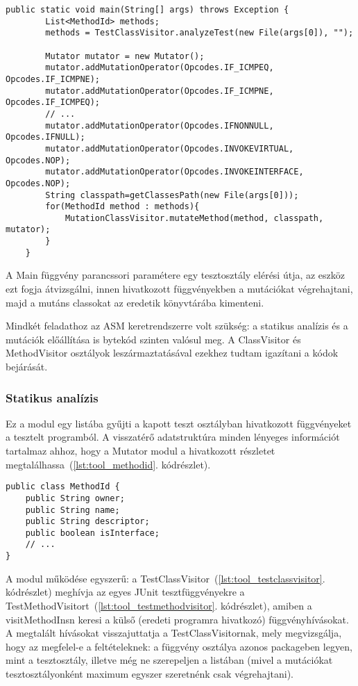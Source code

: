 \begin{lstlisting}[frame=single,float=!ht,caption={Main függvény},captionpos=b,label={lst:tool_main}]
    public static void main(String[] args) throws Exception {
        List<MethodId> methods;
        methods = TestClassVisitor.analyzeTest(new File(args[0]), "");

        Mutator mutator = new Mutator();
        mutator.addMutationOperator(Opcodes.IF_ICMPEQ, Opcodes.IF_ICMPNE);
        mutator.addMutationOperator(Opcodes.IF_ICMPNE, Opcodes.IF_ICMPEQ);
        // ...
        mutator.addMutationOperator(Opcodes.IFNONNULL, Opcodes.IFNULL);
        mutator.addMutationOperator(Opcodes.INVOKEVIRTUAL, Opcodes.NOP);
        mutator.addMutationOperator(Opcodes.INVOKEINTERFACE, Opcodes.NOP);
        String classpath=getClassesPath(new File(args[0]));
        for(MethodId method : methods){
            MutationClassVisitor.mutateMethod(method, classpath, mutator);
        }
    }
\end{lstlisting}

A Main függvény parancssori paramétere egy tesztosztály elérési útja, az eszköz ezt fogja átvizsgálni, innen hivatkozott függvényekben a mutációkat végrehajtani, majd a mutáns classokat az eredetik könyvtárába kimenteni.

Mindkét feladathoz az ASM keretrendszerre volt szükség: a statikus analízis és a mutációk előállítása is bytekód szinten valósul meg. A ClassVisitor és MethodVisitor osztályok leszármaztatásával ezekhez tudtam igazítani a kódok bejárását.
\subsubsection{Statikus analízis}
Ez a modul egy listába gyűjti a kapott teszt osztályban hivatkozott függvényeket a tesztelt programból. A visszatérő adatstruktúra minden lényeges információt tartalmaz ahhoz, hogy a Mutator modul a hivatkozott részletet megtalálhassa~(\ref{lst:tool_methodid}. kódrészlet).

\begin{lstlisting}[frame=single,float=!ht,caption={MethodId adatstruktúra},captionpos=b,label={lst:tool_methodid}]
public class MethodId {
    public String owner;
    public String name;
    public String descriptor;
    public boolean isInterface;
    // ...
}
\end{lstlisting}

A modul működése egyszerű: a TestClassVisitor~(\ref{lst:tool_testclassvisitor}. kódrészlet) meghívja az egyes JUnit tesztfüggvényekre a TestMethodVisitort~(\ref{lst:tool_testmethodvisitor}. kódrészlet), amiben a visitMethodInsn keresi a külső (eredeti programra hivatkozó) függvényhívásokat. A megtalált hívásokat visszajuttatja a TestClassVisitornak, mely megvizsgálja, hogy az megfelel-e a feltételeknek: a függvény osztálya azonos packageben legyen, mint a tesztosztály, illetve még ne szerepeljen a listában (mivel a mutációkat tesztosztályonként maximum egyszer szeretnénk csak végrehajtani).

